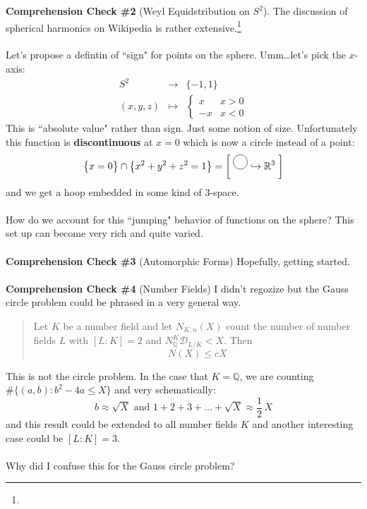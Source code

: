 \documentclass[12pt]{article}
\begin{document}
\noindent \textbf{Comprehension Check \#2} (Weyl Equidstribution on $S^2$). The discussion of spherical harmonics on Wikipedia is rather extensive.\footnote{}\\ \\
Let's propose a defintin of ``sign" for points on the sphere.  Umm\dots let's pick the $x$-axis:
\begin{eqnarray*}
S^2 &\to& \{ -1, 1 \} \\
(x,y,z) & \mapsto &  
\left\{ 
\begin{array}{rc} x & x > 0 \\ -x & x < 0 \end{array} 
\right.
\end{eqnarray*}
This is ``absolute value" rather than sign.  Just some notion of size. Unfortunately this function is \textbf{discontinuous} at $x = 0$ which is now a circle instead of a point:
$$  \big\{  x = 0 \big\}  \cap \big\{ x^2 + y^2 + z^2 = 1\big\} = \left[ \;
\begin{tikz} \draw (0,0) circle (0.25); \end{tikz} \hookrightarrow \mathbb{R}^3 \;\right] $$
and we get a hoop embedded in some kind of 3-space.  \\ \\
How do we account for this ``jumping" behavior of functions on the sphere?  This set up can become very rich and quite varied. \\ \\  
\noindent \textbf{Comprehension Check \#3} (Automorphic Forms) Hopefully, getting started. \\ \\
\noindent \textbf{Comprehension Check \#4} (Number Fields) I didn't regozize but the Gauss circle problem could be phrased in a very general way.  
\begin{quotation}
Let $K$ be a number field and let $N_{K,n}(X)$ count the number of number fields $L$ with $[L:K] = 2$ and $N_\mathbb{Q}^K \mathcal{D}_{L/K} < X $. Then 
$$ N(X) \leq c X $$ 
\end{quotation} 
This is not the circle problem.  In the case that $K = \mathbb{Q}$, we are counting $\# \{ (a,b): b^2 - 4a \leq X \}$ and very schematically:
$$ b \approx \sqrt{X} \text{ and } 1+2+3+\dots + \sqrt{X} \approx \frac{1}{2}\, X $$
and this result could be extended to all number fields $K$ and another interesting case could be $[L:K] = 3$.  \\ \\
Why did I confuse this for the Gauss circle problem?
\end{document}
